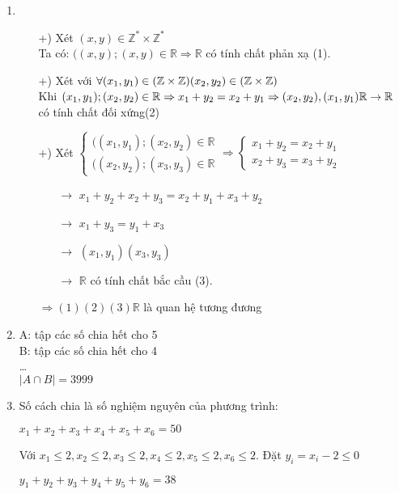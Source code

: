 \documentclass[12pt,oneside]{book}
\begin{document}
\begin{enumerate}[label = {\bf Câu \arabic*.}]
	\item 
	\begin{itemize}
		\item[+)] Xét $(x,y) \in \mathbb{Z}^* \times \mathbb{Z}^*$\\
		Ta có: $((x,y);(x,y) \in \mathbb{R} \Rightarrow \mathbb{R}$ có tính chất phản xạ (1).
		\item[+)] Xét với $\forall (x_1,y_1) \in (\mathbb{Z\times Z})\\
		(x_2,y_2) \in (\mathbb{Z\times Z})
		$\\
		Khi $(x_1,y_1);(x_2,y_2)\in \mathbb{R} \Rightarrow x_1+y_2=x_2+y_1\\
		\Rightarrow (x_2,y_2),(x_1,y_1) \mathbb{R \rightarrow R}$ có tính chất đối xứng(2)
		\item[+)] Xét $\begin{cases}
			((x_1,y_1);(x_2,y_2) \in \mathbb{R}\\
			((x_2,y_2);(x_3,y_3) \in \mathbb{R}
		\end{cases} \Rightarrow
		\begin{cases}
			x_1+y_2=x_2+y_1\\
			x_2+y_3=x_3+y_2
		\end{cases}$       
		\begin{itemize}
			\item[$\rightarrow$] $x_1+y_2+x_2+y_3=x_2+y_1+x_3+y_2$
			\item[$\rightarrow$] $x_1+y_3=y_1+x_3$
			\item[$\rightarrow$] $(x_1,y_1)(x_3,y_3)$
			\item[$\rightarrow$] $\mathbb{R}$ có tính chất bắc cầu (3). 
		\end{itemize}
		$\Rightarrow (1)(2)(3) \mathbb{R}$ là quan hệ tương đương 
	\end{itemize}
	\item 
	A: tập các số chia hết cho 5\\
	B: tập các số chia hết cho 4\\
	\dots\\
	$|A\cap B |=3999$
	\item Số cách chia là số nghiệm nguyên của phương trình:
	\begin{center}
		$x_1+x_2+x_3+x_4+x_5+x_6=50$
	\end{center}
	Với $x_1\leq 2,x_2\leq 2, x_3\leq 2, x_4\leq 2, x_5\leq 2, x_6\leq 2$. Đặt $y_i=x_i-2 \leq 0$
	\begin{center}
		$y_1+y_2+y_3+y_4+y_5+ y_6=38$

\end{center}
\end{enumerate}
\end{document}
